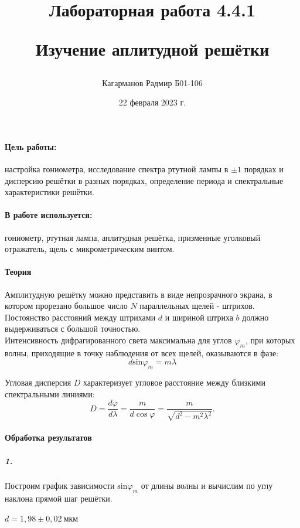 \documentclass[a4paper,12pt]{article}
\title{Лабораторная работа 4.4.1 

Изучение аплитудной решётки}
\author{Кагарманов Радмир Б01-106}
\date{22 февраля 2023 г.}
\begin{document}
\maketitle
\thispagestyle{empty}
\newpage
\setcounter{page}{1}

\paragraph{Цель работы:} настройка гониометра, исследование спектра ртутной лампы в $\pm1$ порядках и дисперсию решётки в разных порядках, определение периода и спектральные характеристики решётки.

\paragraph{В работе используется:} гониометр, ртутная лампа, аплитудная решётка, призменные уголковый отражатель, щель с микрометрическим винтом.

\paragraph{Теория\\}
$\textbf{Амплитудную решётку}$ можно представить в виде непрозрачного экрана, в котором прорезано большое число $N$ параллельных щелей - штрихов. Постоянство расстояний между штрихами $d$ и шириной штриха $b$ должно выдерживаться с большой точностью.\\
Интенсивность дифрагированного света максимальна для углов $\varphi_{m}$, при которых волны, приходящие в точку наблюдения от всех щелей, оказываются в фазе:
\begin{equation}
    d\text{sin}\varphi_{m}=m\lambda
\end{equation}

Угловая дисперсия $D$ характеризует угловое расстояние между близкими спектральными линиями:
	\begin{equation}
	D = \frac{d\varphi}{d\lambda} = \frac{m}{d \cos \varphi}=\frac{m}{\sqrt{d^{2}-m^{2} \lambda^{2}}}.
	\end{equation}

\paragraph{Обработка результатов}
\subparagraph{1.} Построим график зависимости $\text{sin} \varphi_{m}$ от длины волны и вычислим по углу наклона прямой шаг решётки.
\begin{center}
    $d = 1,98\pm 0,02 ~ мкм$
\end{center}
\end{document}
